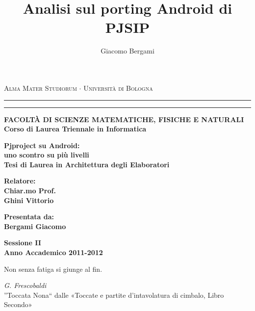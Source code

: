 \title{Analisi sul porting Android di PJSIP}
\author{Giacomo Bergami}

\begin{list}{}{
  \setlength{\topsep}{0pt}
  \setlength{\leftmargin}{0pt}%
  \setlength{\rightmargin}{0pt}%
  \setlength{\listparindent}{0pt}%
  \setlength{\itemindent}{0pt}%
  \setlength{\parsep}{0pt}%
 }%
\item[]
\thispagestyle{empty}
\begin{center}
\item[]
{{\Large{\textsc{Alma Mater Studiorum $\cdot$ Universit\`a di
Bologna}}}} \rule[0.1cm]{15.8cm}{0.1mm}
\rule[0.5cm]{15.8cm}{0.6mm}
{\small{\bf FACOLT\`A DI SCIENZE MATEMATICHE, FISICHE E NATURALI\\
Corso di Laurea Triennale in Informatica}}
\end{center}
\vspace{15mm}
\begin{center}
{\LARGE{\bf Pjproject su Android:}}\\
\vspace{5mm}
{\LARGE{\bf uno scontro su più livelli}}\\
\vspace{19mm} {\large{\bf Tesi di Laurea in Architettura degli Elaboratori}}
\end{center}
\vspace{40mm}
\par
\noindent
\begin{minipage}[t]{0.47\textwidth}
{\large{\bf Relatore:\\
Chiar.mo Prof.\\
Ghini Vittorio}}
\end{minipage}
\hfill
\begin{minipage}[t]{0.47\textwidth}\raggedleft
{\large{\bf Presentata da:\\
Bergami Giacomo}}
\end{minipage}
\vspace{20mm}
\begin{center}
{\large{\bf Sessione II\\%
Anno Accademico 2011-2012}}%
\end{center}
\end{list}
\pagebreak

\tableofcontents


\begin{list}{}{
  \setlength{\topsep}{\textwidth $ $}
  \setlength{\leftmargin}{0pt}%
  \setlength{\rightmargin}{0pt}%
  \setlength{\listparindent}{0pt}%
  \setlength{\itemindent}{0pt}%
  \setlength{\parsep}{0pt}%
 }%
\item[]
\thispagestyle{empty}
\epigraph{Non senza fatiga si giunge al fin.}%
{\textit{G. Frescobaldi}\\''Toccata Nona`` dalle «Toccate e partite d'intavolatura di cimbalo, Libro Secondo»}
\end{list}
\pagebreak

\pagebreak
